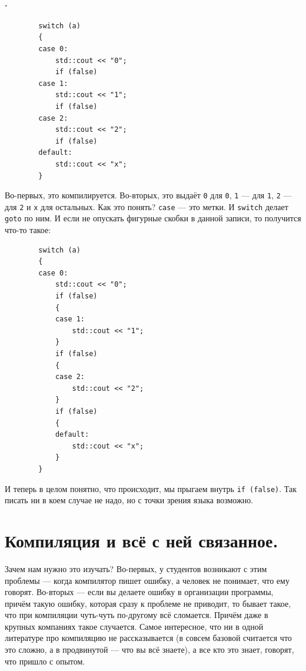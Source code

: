 \documentclass{article}
\begin{document}
    \paragraph{.}
    \begin{verbatim}
        switch (a)
        {
        case 0:
            std::cout << "0";
            if (false)
        case 1:
            std::cout << "1";
            if (false)
        case 2:
            std::cout << "2";
            if (false)
        default:
            std::cout << "x";
        }
    \end{verbatim}
    Во-первых, это компилируется. Во-вторых, это выдаёт \verb|0| для \texttt{0}, \verb|1| --- для \texttt{1}, \verb|2| --- для \texttt{2} и \verb|x| для остальных. Как это понять? \texttt{case} --- это метки. И \texttt{switch} делает \texttt{goto} по ним. И если не опускать фигурные скобки в данной записи, то получится что-то такое:
    \begin{verbatim}
        switch (a)
        {
        case 0:
            std::cout << "0";
            if (false)
            {
            case 1:
                std::cout << "1";
            }
            if (false)
            {
            case 2:
                std::cout << "2";
            }
            if (false)
            {
            default:
                std::cout << "x";
            }
        }
    \end{verbatim}
    И теперь в целом понятно, что происходит, мы прыгаем внутрь \texttt{if (false)}. Так писать ни в коем случае не надо, но с точки зрения языка возможно.
    \section{Компиляция и всё с ней связанное.}
    Зачем нам нужно это изучать? Во-первых, у студентов возникают с этим проблемы --- когда компилятор пишет ошибку, а человек не понимает, что ему говорят. Во-вторых --- если вы делаете ошибку в организации программы, причём такую ошибку, которая сразу к проблеме не приводит, то бывает такое, что при компиляции чуть-чуть по-другому всё сломается. Причём даже в крупных компаниях такое случается. Самое интересное, что ни в одной литературе про компиляцию не рассказывается (в совсем базовой считается что это сложно, а в продвинутой --- что вы всё знаете), а все кто это знает, говорят, что пришло с опытом. 
\end{document}
